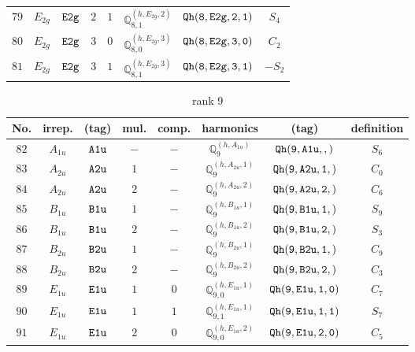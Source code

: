 \documentclass[fleqn,8pt]{jsarticle}
\begin{document}
\begin{table}[ht!]
\begin{center}
\begin{tabular}{cccccccc}
$ 79 $ & $ E_{2g} $ & $ {\tt E2g} $ & $ 2 $ & $ 1 $ & $ \mathbb{Q}_{8,1}^{(h,E_{2g},2)} $ & $ {\tt Qh(8,E2g,2,1)} $ & $ S_{4} $ \\
$ 80 $ & $ E_{2g} $ & $ {\tt E2g} $ & $ 3 $ & $ 0 $ & $ \mathbb{Q}_{8,0}^{(h,E_{2g},3)} $ & $ {\tt Qh(8,E2g,3,0)} $ & $ C_{2} $ \\
$ 81 $ & $ E_{2g} $ & $ {\tt E2g} $ & $ 3 $ & $ 1 $ & $ \mathbb{Q}_{8,1}^{(h,E_{2g},3)} $ & $ {\tt Qh(8,E2g,3,1)} $ & $ - S_{2} $ \\
 \hline \hline
\end{tabular}
\end{center}
\end{table}
\begin{table}[ht!]
\begin{center}
\caption{rank 9}
\renewcommand{\arraystretch}{1.3}
\begin{tabular}{cccccccc} \hline \hline
No. & irrep. & (tag) & mul. & comp. & harmonics & (tag) & definition \\ \hline
$ 82 $ & $ A_{1u} $ & $ {\tt A1u} $ & $ - $ & $ - $ & $ \mathbb{Q}_{9}^{(h,A_{1u})} $ & $ {\tt Qh(9,A1u,,)} $ & $ S_{6} $ \\
$ 83 $ & $ A_{2u} $ & $ {\tt A2u} $ & $ 1 $ & $ - $ & $ \mathbb{Q}_{9}^{(h,A_{2u},1)} $ & $ {\tt Qh(9,A2u,1,)} $ & $ C_{0} $ \\
$ 84 $ & $ A_{2u} $ & $ {\tt A2u} $ & $ 2 $ & $ - $ & $ \mathbb{Q}_{9}^{(h,A_{2u},2)} $ & $ {\tt Qh(9,A2u,2,)} $ & $ C_{6} $ \\
$ 85 $ & $ B_{1u} $ & $ {\tt B1u} $ & $ 1 $ & $ - $ & $ \mathbb{Q}_{9}^{(h,B_{1u},1)} $ & $ {\tt Qh(9,B1u,1,)} $ & $ S_{9} $ \\
$ 86 $ & $ B_{1u} $ & $ {\tt B1u} $ & $ 2 $ & $ - $ & $ \mathbb{Q}_{9}^{(h,B_{1u},2)} $ & $ {\tt Qh(9,B1u,2,)} $ & $ S_{3} $ \\
$ 87 $ & $ B_{2u} $ & $ {\tt B2u} $ & $ 1 $ & $ - $ & $ \mathbb{Q}_{9}^{(h,B_{2u},1)} $ & $ {\tt Qh(9,B2u,1,)} $ & $ C_{9} $ \\
$ 88 $ & $ B_{2u} $ & $ {\tt B2u} $ & $ 2 $ & $ - $ & $ \mathbb{Q}_{9}^{(h,B_{2u},2)} $ & $ {\tt Qh(9,B2u,2,)} $ & $ C_{3} $ \\
$ 89 $ & $ E_{1u} $ & $ {\tt E1u} $ & $ 1 $ & $ 0 $ & $ \mathbb{Q}_{9,0}^{(h,E_{1u},1)} $ & $ {\tt Qh(9,E1u,1,0)} $ & $ C_{7} $ \\
$ 90 $ & $ E_{1u} $ & $ {\tt E1u} $ & $ 1 $ & $ 1 $ & $ \mathbb{Q}_{9,1}^{(h,E_{1u},1)} $ & $ {\tt Qh(9,E1u,1,1)} $ & $ S_{7} $ \\
$ 91 $ & $ E_{1u} $ & $ {\tt E1u} $ & $ 2 $ & $ 0 $ & $ \mathbb{Q}_{9,0}^{(h,E_{1u},2)} $ & $ {\tt Qh(9,E1u,2,0)} $ & $ C_{5} $ \\

\end{tabular}
\end{center}
\end{table}
\end{document}
